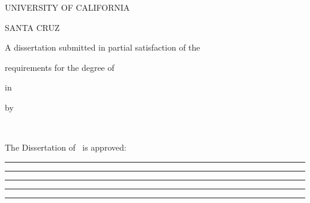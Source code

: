 \thispagestyle{empty}
\begin{singlespace}
\begin{center}
UNIVERSITY OF CALIFORNIA\par\smallskip
SANTA CRUZ\par\bigskip
\textbf{\MakeUppercase{\ThesisTitle}}\par\bigskip
A dissertation submitted in partial satisfaction of the\par
requirements for the degree of\par\bigskip
\DegreeName\par\bigskip
in\par\bigskip
\DegreeField\par\bigskip
by\par\bigskip
\textbf{\AuthorName}\par\bigskip
\DegreeMonth\ \DegreeYear\par
\end{center}
\vfill
\noindent\hfill\begin{minipage}{3.0in}
\raggedright
The Dissertation of \AuthorName\ is approved:
\par\medskip
\rule{\linewidth}{0.4pt}\par\CommitteeOne\par\medskip
\rule{\linewidth}{0.4pt}\par\CommitteeTwo\par\medskip
\rule{\linewidth}{0.4pt}\par\CommitteeThree\par\medskip
\rule{\linewidth}{0.4pt}\par\CommitteeFour\par
\end{minipage}
\par\bigskip
\noindent\begin{minipage}{3.0in}
\rule{\linewidth}{0.4pt}\par\DeanName\par\DeanTitle
\end{minipage}
\end{singlespace}
\clearpage
